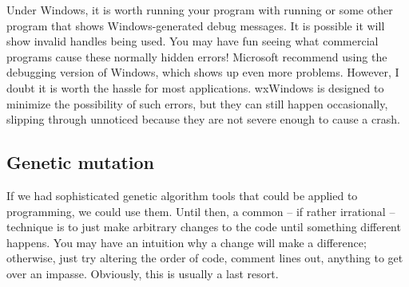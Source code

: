 Under Windows, it is worth running your program with 
 running or
some other program that shows Windows-generated debug messages. It is
possible it will show invalid handles being used. You may have fun seeing
what commercial programs cause these normally hidden errors! Microsoft
recommend using the debugging version of Windows, which shows up even
more problems. However, I doubt it is worth the hassle for most
applications. wxWindows is designed to minimize the possibility of such
errors, but they can still happen occasionally, slipping through unnoticed
because they are not severe enough to cause a crash.

\subsection{Genetic mutation}

If we had sophisticated genetic algorithm tools that could be applied
to programming, we could use them. Until then, a common -- if rather irrational --
technique is to just make arbitrary changes to the code until something
different happens. You may have an intuition why a change will make a difference;
otherwise, just try altering the order of code, comment lines out, anything
to get over an impasse. Obviously, this is usually a last resort.

